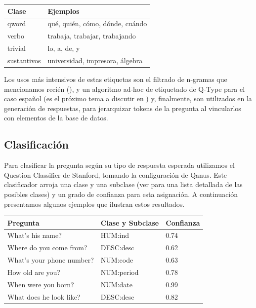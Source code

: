 \begin{center}
\begin{tabular}{| l | l |}
\hline
Clase & Ejemplos\\ \hline
qword  & qué, quién, cómo, dónde, cuándo\\ \hline
verbo & trabaja, trabajar, trabajando \\ \hline
trivial  & lo, a, de, y \\ \hline
sustantivos  & universidad, impresora, álgebra \\ \hline
\end{tabular}
\end{center}

Los usos más intensivos de estas etiquetas son el filtrado de n-gramas que mencionamos recién (), y un algoritmo ad-hoc de etiquetado de Q-Type para el caso español (es el próximo tema a discutir en ) y, finalmente, son utilizados en la generación de respuestas, para jerarquizar  tokens de la pregunta al vincularlos con elementos de la base de datos.

\subsection{Clasificación}
\label{subsec:qtype}
Para clasificar la pregunta según su tipo de respuesta esperada utilizamos el Question Classifier de Stanford, tomando la configuración de Qanus. Este clasificador arroja una clase y una subclase (ver  para una lista detallada de las posibles clases) y un grado de confianza para esta asignación. A continuación presentamos algunos ejemplos que ilustran estos resultados.

\begin{center}
\begin{tabular}{| l | l | l |}
\hline
Pregunta & Clase y Subclase & Confianza\\ \hline 
What's his name? & HUM:ind & 0.74 \\ \hline 
Where do you come from? & DESC:desc & 0.62 \\ \hline 
What's your phone number? & NUM:code & 0.63 \\ \hline 
How old are you? & NUM:period & 0.78 \\ \hline 
When were you born? & NUM:date & 0.99 \\ \hline 
What does he look like? & DESC:desc & 0.82 \\ \hline 
\end{tabular}
\end{center}

